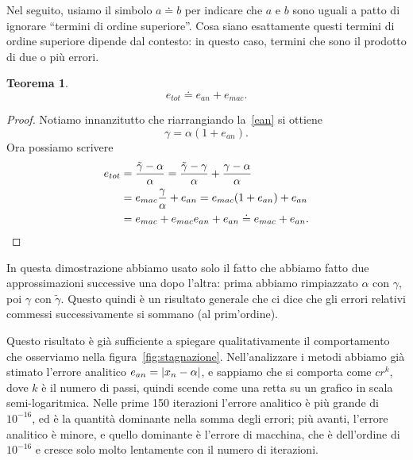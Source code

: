 \documentclass[a4paper]{report}
\DeclarePairedDelimiter{\abs}{\lvert}{\rvert}
\newtheorem{theorem}{Teorema}[chapter]
\theoremstyle{definiton}
\theoremstyle{remark}
\begin{document}
Nel seguito, usiamo il simbolo $a \doteq b$ per indicare che $a$ e $b$ sono uguali a patto di ignorare ``termini di ordine superiore''. Cosa siano esattamente questi termini di ordine superiore dipende dal contesto: in questo caso, termini che sono il prodotto di due o più errori.
\begin{theorem}
\[
e_{tot} \doteq e_{an} + e_{mac}.
\]
\end{theorem}
\begin{proof} Notiamo innanzitutto che riarrangiando la~\eqref{ean} si ottiene
\[
\gamma = \alpha(1+e_{an}).
\]
Ora possiamo scrivere
\begin{align*}
e_{tot} &= \frac{\tilde{\gamma} - \alpha}{\alpha} = \frac{\tilde{\gamma} - \gamma}{\alpha} + \frac{\gamma - \alpha}{\alpha}\\
&= e_{mac}\frac{\gamma}{\alpha} + e_{an} = e_{mac}(1+e_{an}) + e_{an}\\
&= e_{mac} + e_{mac}e_{an} + e_{an} \doteq e_{mac} + e_{an}. \qedhere
\end{align*}
\end{proof}
In questa dimostrazione abbiamo usato solo il fatto che abbiamo fatto due approssimazioni successive una dopo l'altra: prima abbiamo rimpiazzato $\alpha$ con $\gamma$, poi $\gamma$ con $\tilde{\gamma}$. Questo quindi è un risultato generale che ci dice che gli errori relativi commessi successivamente si sommano (al prim'ordine).

Questo risultato è già sufficiente a spiegare qualitativamente il comportamento che osserviamo nella figura~\ref{fig:stagnazione}. Nell'analizzare i metodi abbiamo già stimato l'errore analitico $e_{an} = \abs{x_n - \alpha}$, e sappiamo che si comporta come $cr^k$, dove $k$ è il numero di passi, quindi scende come una retta su un grafico in scala semi-logaritmica. Nelle prime 150 iterazioni l'errore analitico è più grande di $10^{-16}$, ed è la quantità dominante nella somma degli errori; più avanti, l'errore analitico è minore, e quello dominante è l'errore di macchina, che è dell'ordine di $10^{-16}$ e cresce solo molto lentamente con il numero di iterazioni.
\end{document}
